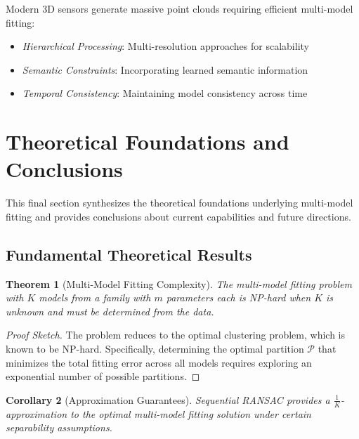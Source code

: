\documentclass[12pt]{article}
\newtheorem{theorem}{Theorem}[section]
\newtheorem{corollary}[theorem]{Corollary}
\begin{document}
Modern 3D sensors generate massive point clouds requiring efficient multi-model fitting:

\begin{itemize}
    \item \textit{Hierarchical Processing}: Multi-resolution approaches for scalability
    \item \textit{Semantic Constraints}: Incorporating learned semantic information
    \item \textit{Temporal Consistency}: Maintaining model consistency across time
\end{itemize}

\newpage

\section{Theoretical Foundations and Conclusions}
\label{sec:conclusions}

This final section synthesizes the theoretical foundations underlying multi-model fitting and provides conclusions about current capabilities and future directions.

\subsection{Fundamental Theoretical Results}
\label{subsec:fundamental_results}

\begin{theorem}[Multi-Model Fitting Complexity]
    \label{thm:multimodel_complexity}
    The multi-model fitting problem with $K$ models from a family with $m$ parameters each is NP-hard when $K$ is unknown and must be determined from the data.
\end{theorem}

\begin{proof}[Proof Sketch]
    The problem reduces to the optimal clustering problem, which is known to be NP-hard. Specifically, determining the optimal partition $\mathcal{P}$ that minimizes the total fitting error across all models requires exploring an exponential number of possible partitions.
\end{proof}

\begin{corollary}[Approximation Guarantees]
    \label{cor:approximation_guarantees}
    Sequential RANSAC provides a $\frac{1}{K}$-approximation to the optimal multi-model fitting solution under certain separability assumptions.
\end{corollary}
\end{document}
